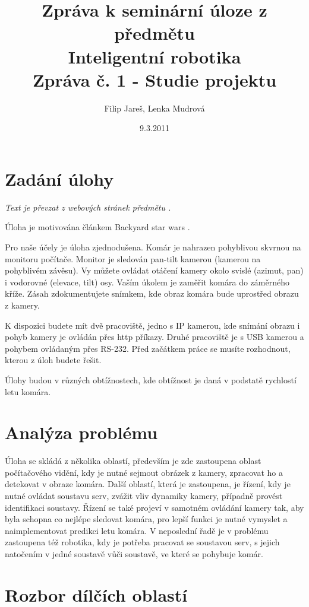 \documentclass[a4paper,10pt]{article}
\title{Zpráva k seminární úloze z předmětu\\ Inteligentní robotika \\ {\small Zpráva č. 1 - Studie projektu}}
\author{Filip Jareš, Lenka Mudrová}
\date{9.3.2011}
\begin{document}
\maketitle

\section*{Zadání úlohy}
{\small \textit{Text je převzat z webových stránek předmětu \cite{web}.}}

Úloha je motivována článkem Backyard star wars \cite{zadani}.

Pro naše účely je úloha zjednodušena. Komár je nahrazen pohyblivou skvrnou na monitoru počítače. Monitor je sledován pan-tilt kamerou (kamerou na pohyblivém závěsu). Vy můžete ovládat otáčení kamery okolo svislé (azimut, pan) i vodorovné (elevace, tilt) osy. Vaším úkolem je zaměřit komára do záměrného kříže. Zásah zdokumentujete snímkem, kde obraz komára bude uprostřed obrazu z kamery.

K dispozici budete mít dvě pracoviště, jedno s IP kamerou, kde snímání obrazu i pohyb kamery je ovládán přes http příkazy. Druhé pracoviště je s USB kamerou a pohybem ovládaným přes RS-232. Před začátkem práce se musíte rozhodnout, kterou z úloh budete řešit.

Úlohy budou v různých obtížnostech, kde obtížnost je daná v podstatě rychlostí letu komára.

\section{Analýza problému}
Úloha se skládá z několika oblastí, především je zde zastoupena oblast počítačového vidění, kdy je nutné sejmout obrázek z kamery, zpracovat ho a detekovat v obraze komára. Další oblastí, která je zastoupena, je řízení, kdy je nutné ovládat soustavu serv, zvážit vliv dynamiky kamery, případně provést identifikaci soustavy. Řízení se také projeví v samotném ovládání kamery tak, aby byla schopna co nejlépe sledovat komára, pro lepší funkci je nutné vymyslet a naimplementovat predikci letu komára. V neposlední řadě je v problému zastoupena též robotika, kdy je potřeba pracovat se soustavou serv, s jejich natočením v jedné soustavě vůči soustavě, ve které se pohybuje komár.

\section{Rozbor dílčích oblastí}
\end{document}
